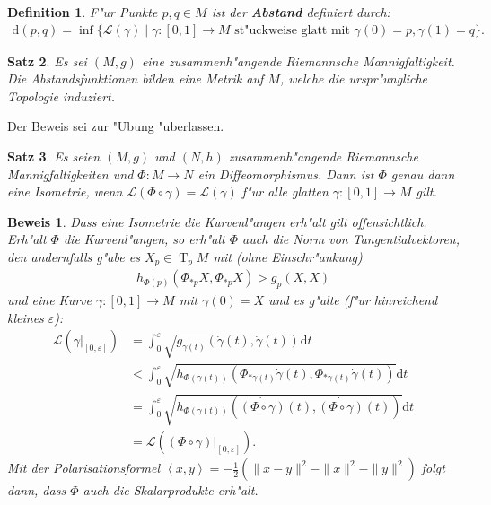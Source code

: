\documentclass[paper=A4, twoside, chapterprefix=true, bibliography=totoc, headsepline]{scrbook}
\let\temp\phi{}
\let\phi\varphi{}
\let\varphi\temp{}
\let\temp\theta{}
\let\theta\vartheta{}
\let\vartheta\temp{}
\let\temp\epsilon{}
\let\epsilon\varepsilon{}
\let\varepsilon\temp{}
\let\temp\rho{}
\let\rho\varrho{}
\let\varrho\temp{}
\DeclareMathOperator{\T}{T}         %
\newcommand{\dop}{\mathrm{d}}
\theoremstyle{plain}
\newtheorem{Dfn}{Definition}[chapter]
\newtheorem{Satz}[Dfn]{Satz}
\theoremstyle{nonumberplain}
\newtheorem{bew}{Beweis}
\theoremstyle{empty}
\theoremstyle{break}
\newcommand{\CmIndex}[2][]{\ifthenelse{\isempty{#1}}{\index{#2}}{\index{#1}}#2}
\newcommand{\CmMark}[2][]{\textbf{\CmIndex[#1]{#2}}}
\begin{document}
\begin{Dfn}
  F"ur Punkte $p, q \in M$ ist der \CmMark{Abstand} definiert durch:
  \begin{align*}
    \dop(p,q) = \inf\{ \mathcal L(\gamma) \mid \gamma \colon [0,1] \to M \text{ st"uckweise glatt mit } \gamma(0) = p, \gamma(1) = q\}.
  \end{align*}
\end{Dfn}

\begin{Satz}
  Es sei $(M,g)$ eine zusammenh"angende Riemannsche Mannigfaltigkeit.
  Die Abstandsfunktionen bilden eine Metrik auf $M$, welche die urspr"ungliche Topologie induziert.
\end{Satz}

Der Beweis sei zur "Ubung "uberlassen.

\begin{Satz}
  Es seien $(M,g)$ und $(N,h)$ zusammenh"angende Riemannsche Mannigfaltigkeiten und $\Phi \colon M \to N$ ein Diffeomorphismus.
  Dann ist $\Phi$ genau dann eine Isometrie, wenn $\mathcal L(\Phi \circ \gamma) = \mathcal L(\gamma)$ f"ur alle glatten $\gamma \colon [0,1] \to M$ gilt. 
\end{Satz}

\begin{bew}
  Dass eine Isometrie die Kurvenl"angen erh"alt gilt offensichtlich. Erh"alt $\Phi$ die Kurvenl"angen, so erh"alt $\Phi$ auch die Norm von Tangentialvektoren, den andernfalls g"abe es $X_p \in \T_pM$ mit (ohne Einschr"ankung)
  \begin{align*}
    h_{\Phi(p)}(\Phi_{*p}X,\Phi_{*p}X) > g_p(X,X)
  \end{align*}
  und eine Kurve $\gamma\colon [0,1] \to M$ mit $\gamma(0) = X$ und es g"alte (f"ur hinreichend kleines $\epsilon$):
  \begin{align*}
    \mathcal L(\gamma|_{[0,\epsilon]}) & = \int_0^{\epsilon}\sqrt{g_{\gamma(t)}\left(\dot\gamma(t),\dot\gamma(t)\right)}\dop t\\
    & < \int_0^{\epsilon}\sqrt{h_{\Phi(\gamma(t))} \left(\Phi_{*\gamma(t)}\dot\gamma(t), \Phi_{*\gamma(t)}\dot\gamma(t)\right)}\dop t\\
    & = \int_0^{\epsilon}\sqrt{h_{\Phi(\gamma(t))} \left(\dot{(\Phi \circ \gamma)}(t), \dot{(\Phi \circ \gamma)}(t) \right)}\dop t\\
    & = \mathcal L \left((\Phi \circ \gamma)|_{[0,\epsilon]}\right).
  \end{align*}
  Mit der Polarisationsformel $\left<x,y\right> = - \frac{1}2 (\|x-y\|^{2} - \|x\|^2-\|y\|^2)$ folgt dann, dass $\Phi$ auch die Skalarprodukte erh"alt.
\end{bew}
\end{document}
